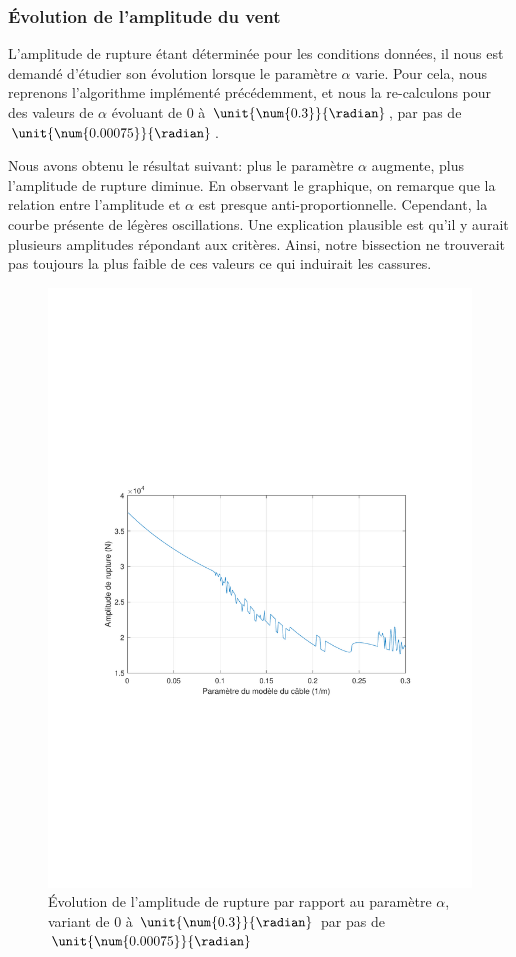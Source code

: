 \documentclass[a4paper, 12pt]{article}
\begin{document}
	\subsubsection{Évolution de l'amplitude du vent}
	L'amplitude de rupture étant déterminée pour les conditions données, il nous est demandé d'étudier son évolution lorsque le paramètre $\alpha$ varie. Pour cela, nous reprenons l'algorithme implémenté précédemment, et nous la re-calculons pour des valeurs de $\alpha$ évoluant de $\unit{\num{0}}{}$ à $\unit{\num{0.3}}{\radian}$, par pas de $\unit{\num{0.00075}}{\radian}$.\par
	Nous avons obtenu le résultat suivant: plus le paramètre $\alpha$ augmente, plus l'amplitude de rupture diminue. En observant le graphique, on remarque que la relation entre l'amplitude et $\alpha$ est presque anti-proportionnelle.
	Cependant, la courbe présente de légères oscillations. Une explication plausible est qu'il y aurait plusieurs amplitudes répondant aux critères. Ainsi, notre bissection ne trouverait pas toujours la plus faible de ces valeurs ce qui induirait les cassures.
	\begin{figure}[H]
		\centering
		\includegraphics[width = \textwidth]{resources/pdf/Q33.pdf}
		\caption{Évolution de l'amplitude de rupture par rapport au paramètre $\alpha$, variant de $\unit{\num{0}}{}$ à $\unit{\num{0.3}}{\radian}$ par pas de $\unit{\num{0.00075}}{\radian}$}
	\end{figure}
\end{document}
